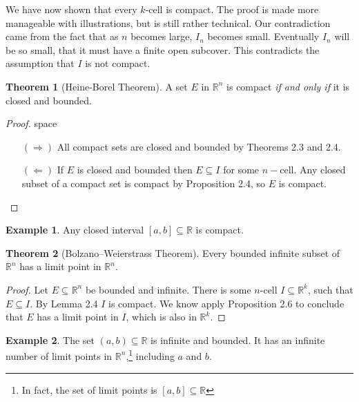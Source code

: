 \documentclass{article}
\newcommand{\R}{\mathbb{R}}
\theoremstyle{definition}
\newtheorem{theorem}{Theorem}[section]
\newtheorem{example}{Example}[section]
\begin{document}
	We have now shown that every $ k $-cell is compact. The proof is made more manageable with illustrations, but is still rather technical. Our contradiction came from the fact that as $ n $ becomes large, $ I_n $ becomes small. Eventually $ I_n $ will be so small, that it must have a finite open subcover. This contradicts the assumption that $ I $ is not compact. 
	\begin{theorem}[Heine-Borel Theorem]
		A set $ E $ in $ \R^n $ is compact \textit{if and only if} it is closed and bounded.
	\end{theorem} 
	\begin{proof}{\color{white}space}
		\begin{enumerate}
			\item [$ (\Longrightarrow) $] All compact sets are closed and bounded by Theorems 2.3 and 2.4. 
			\item [$ (\Longleftarrow) $] If $ E $ is closed and bounded then $ E\subseteq I $ for some $ n -$cell. Any closed subset of a compact set is compact by Proposition 2.4, so $ E $ is compact.
		\end{enumerate}
	\end{proof}
	\begin{example}
		Any closed interval $ [a,b]\subseteq \R$ is compact. 
	\end{example}
	\begin{theorem}[Bolzano–Weierstrass Theorem]
		Every bounded infinite subset of $ \R^n $ has a limit point in $ \R^n $. 
	\end{theorem}
	\begin{proof}
		Let $ E\subseteq\R^n $ be bounded and infinite. There is some $ n $-cell $ I\subseteq\R^k $, such that $ E\subseteq I $. By Lemma 2.4 $ I $ is compact. We know apply Proposition 2.6 to conclude that $ E $ has a limit point in $ I $, which is also in $ \R^k $.
	\end{proof}
	\begin{example}
		The set $ (a,b)\subseteq\R $ is infinite and bounded. It has an infinite number of limit points in $ \R^n $,\footnote{In fact, the set of limit points is $ [a,b]\subseteq\R $} including $ a $ and $ b $.
	\end{example}
\end{document}
